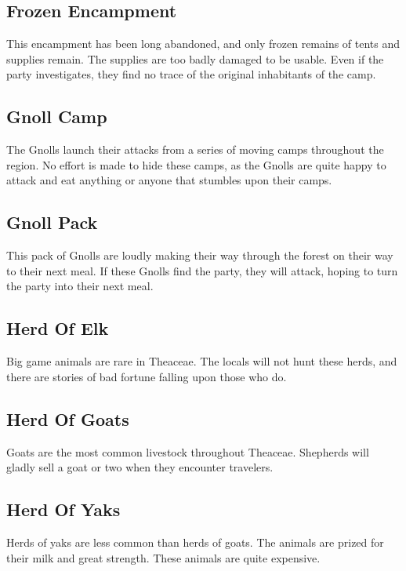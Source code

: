 \subsection{Frozen Encampment}

This encampment has been long abandoned, and only frozen remains of tents and supplies remain.
The supplies are too badly damaged to be usable.
Even if the party investigates, they find no trace of the original inhabitants of the camp.

\subsection{Gnoll Camp}

The Gnolls launch their attacks from a series of moving camps throughout the region.
No effort is made to hide these camps, as the Gnolls are quite happy to attack and eat anything or anyone that stumbles upon their camps.

\subsection{Gnoll Pack}

This pack of Gnolls are loudly making their way through the forest on their way to their next meal.
If these Gnolls find the party, they will attack, hoping to turn the party into their next meal.

\subsection{Herd Of Elk}

Big game animals are rare in Theaceae.
The locals will not hunt these herds, and there are stories of bad fortune falling upon those who do.

\subsection{Herd Of Goats}

Goats are the most common livestock throughout Theaceae.
Shepherds will gladly sell a goat or two when they encounter travelers.

\subsection{Herd Of Yaks}

Herds of yaks are less common than herds of goats.
The animals are prized for their milk and great strength.
These animals are quite expensive.

